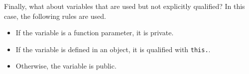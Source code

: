 Finally, what about variables that are used but not explicitly qualified?  In this case, the following rules are used.

\begin{itemize}
\item If the variable is a function parameter, it is private.
\item If the variable is defined in an object, it is qualified with \verb+this.+.
\item Otherwise, the variable is public.
\end{itemize}

